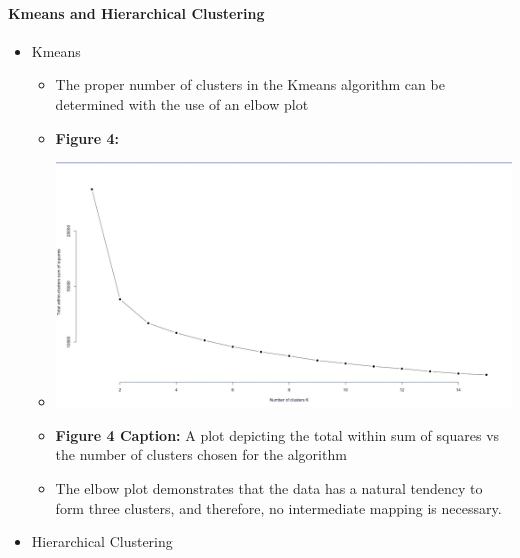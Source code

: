 \documentclass[12pt,]{article}
\providecommand{\tightlist}{%
  \setlength{\itemsep}{0pt}\setlength{\parskip}{0pt}}
\let\oldparagraph\paragraph
\renewcommand{\paragraph}[1]{\oldparagraph{#1}\mbox{}}
\begin{document}
\hypertarget{kmeans-and-hierarchical-clustering}{%
\paragraph{Kmeans and Hierarchical
Clustering}\label{kmeans-and-hierarchical-clustering}}

\begin{itemize}
\tightlist
\item
  Kmeans

  \begin{itemize}
  \tightlist
  \item
    The proper number of clusters in the Kmeans algorithm can be
    determined with the use of an elbow plot
  \item
    \textbf{Figure 4:}
  \item
    \includegraphics{ElbowPlot.jpeg}
  \item
    \textbf{Figure 4 Caption:} A plot depicting the total within sum of
    squares vs the number of clusters chosen for the algorithm
  \item
    The elbow plot demonstrates that the data has a natural tendency to
    form three clusters, and therefore, no intermediate mapping is
    necessary.
  \end{itemize}
\item
  Hierarchical Clustering


\end{itemize}
\end{document}
